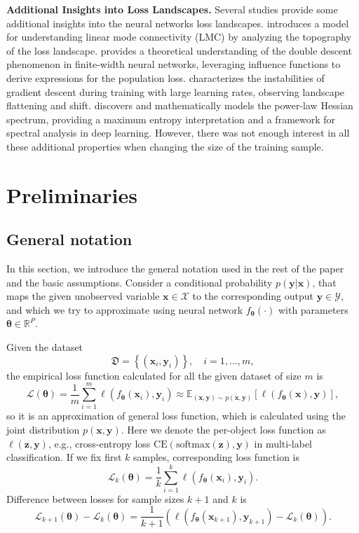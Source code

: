 \documentclass{article}
\begin{document}
\textbf{Additional Insights into Loss Landscapes.}
Several studies provide some additional insights into the neural networks loss landscapes. \cite{singh2024landscapinglinearmodeconnectivity} introduces a model for understanding linear mode connectivity (LMC) by analyzing the topography of the loss landscape. \cite{singh2022phenomenologydoubledescentfinitewidth} provides a theoretical understanding of the double descent phenomenon in finite-width neural networks, leveraging influence functions to derive expressions for the population loss. \cite{wang2023instabilitieslargelearningrate} characterizes the instabilities of gradient descent during training with large learning rates, observing landscape flattening and shift. \cite{xie2022powerlawhessianspectrumsdeep} discovers and mathematically models the power-law Hessian spectrum, providing a maximum entropy interpretation and a framework for spectral analysis in deep learning. However, there was not enough interest in all these additional properties when changing the size of the training sample.

\section{Preliminaries}\label{sec:prelim}

\subsection{General notation}

In this section, we introduce the general notation used in the rest of the paper and the basic assumptions. Consider a conditional probability $p(\mathbf{y}|\mathbf{x})$, that maps the given unobserved variable $\mathbf{x} \in \mathcal{X}$ to the corresponding output $\mathbf{y} \in \mathcal{Y}$, and which we try to approximate using neural network $f_{\boldsymbol{\theta}}(\cdot)$ with parameters $\boldsymbol{\theta} \in \mathbb{R}^{P}$.

Given the dataset
\[ \mathfrak{D} = \left\{ (\mathbf{x}_i, \mathbf{y}_i) \right\}, \quad i = 1, \ldots, m, \]
the empirical loss function calculated for all the given dataset of size $m$ is
\[ \mathcal{L}(\boldsymbol{\theta}) = \dfrac{1}{m} \sum\limits_{i=1}^{m} \ell(f_{\boldsymbol{\theta}}(\mathbf{x}_i), \mathbf{y}_i) \approx \mathbb{E}_{(\mathbf{x}, \mathbf{y}) \sim p(\mathbf{x}, \mathbf{y})} \left[ \ell(f_{\boldsymbol{\theta}}(\mathbf{x}), \mathbf{y}) \right], \]
so it is an approximation of general loss function, which is calculated using the joint distribution $p(\mathbf{x}, \mathbf{y})$. Here we denote the per-object loss function as $\ell(\mathbf{z}, \mathbf{y})$, e.g., cross-entropy loss $\mathrm{CE}(\mathrm{softmax}(\mathbf{z}), \mathbf{y})$ in multi-label classification. If we fix first $k$ samples, corresponding loss function is
\[ \mathcal{L}_k(\boldsymbol{\theta}) = \dfrac{1}{k} \sum\limits_{i=1}^{k} \ell(f_{\boldsymbol{\theta}}(\mathbf{x}_i), \mathbf{y}_i). \]
Difference between losses for sample sizes $k+1$ and $k$ is
\[ \mathcal{L}_{k+1}(\boldsymbol{\theta}) - \mathcal{L}_k(\boldsymbol{\theta}) = \dfrac{1}{k+1} \left( \ell(f_{\boldsymbol{\theta}}(\mathbf{x}_{k+1}), \mathbf{y}_{k+1}) - \mathcal{L}_{k}(\boldsymbol{\theta}) \right). \]
\end{document}
